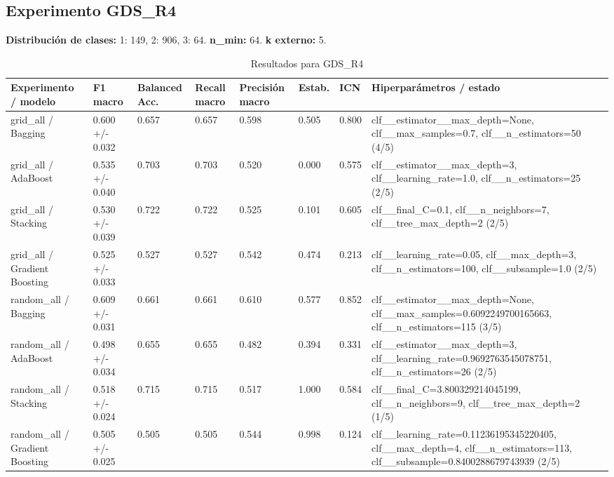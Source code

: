 \documentclass{article}
\begin{document}
\subsection*{Experimento GDS\_R4}
\noindent\textbf{Distribuci\'on de clases:} 1: 149, 2: 906, 3: 64. \textbf{n\_min:} 64. \textbf{k externo:} 5.
\begin{table}[h]
\centering
\caption{Resultados para GDS\_R4}
\scriptsize
\begin{tabular}{p{3.2cm}p{2.0cm}p{1.6cm}p{1.6cm}p{1.8cm}p{1.5cm}p{1.4cm}p{3.4cm}}
\toprule
Experimento / modelo & F1 macro & Balanced Acc. & Recall macro & Precisi\'on macro & Estab. & ICN & Hiperpar\'ametros / estado \\
\midrule
grid\_all / Bagging & 0.600 +/- 0.032 & 0.657 & 0.657 & 0.598 & 0.505 & 0.800 & clf\_\_estimator\_\_max\_depth=None, clf\_\_max\_samples=0.7, clf\_\_n\_estimators=50 (4/5) \\
grid\_all / AdaBoost & 0.535 +/- 0.040 & 0.703 & 0.703 & 0.520 & 0.000 & 0.575 & clf\_\_estimator\_\_max\_depth=3, clf\_\_learning\_rate=1.0, clf\_\_n\_estimators=25 (2/5) \\
grid\_all / Stacking & 0.530 +/- 0.039 & 0.722 & 0.722 & 0.525 & 0.101 & 0.605 & clf\_\_final\_C=0.1, clf\_\_n\_neighbors=7, clf\_\_tree\_max\_depth=2 (2/5) \\
grid\_all / Gradient Boosting & 0.525 +/- 0.033 & 0.527 & 0.527 & 0.542 & 0.474 & 0.213 & clf\_\_learning\_rate=0.05, clf\_\_max\_depth=3, clf\_\_n\_estimators=100, clf\_\_subsample=1.0 (2/5) \\
random\_all / Bagging & 0.609 +/- 0.031 & 0.661 & 0.661 & 0.610 & 0.577 & 0.852 & clf\_\_estimator\_\_max\_depth=None, clf\_\_max\_samples=0.6092249700165663, clf\_\_n\_estimators=115 (3/5) \\
random\_all / AdaBoost & 0.498 +/- 0.034 & 0.655 & 0.655 & 0.482 & 0.394 & 0.331 & clf\_\_estimator\_\_max\_depth=3, clf\_\_learning\_rate=0.9692763545078751, clf\_\_n\_estimators=26 (2/5) \\
random\_all / Stacking & 0.518 +/- 0.024 & 0.715 & 0.715 & 0.517 & 1.000 & 0.584 & clf\_\_final\_C=3.800329214045199, clf\_\_n\_neighbors=9, clf\_\_tree\_max\_depth=2 (1/5) \\
random\_all / Gradient Boosting & 0.505 +/- 0.025 & 0.505 & 0.505 & 0.544 & 0.998 & 0.124 & clf\_\_learning\_rate=0.11236195345220405, clf\_\_max\_depth=4, clf\_\_n\_estimators=113, clf\_\_subsample=0.8400288679743939 (2/5) \\
\bottomrule
\end{tabular}
\end{table}
\end{document}
